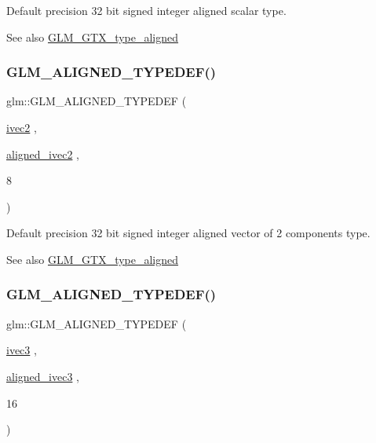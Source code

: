 Default precision 32 bit signed integer aligned scalar type. \begin{DoxySeeAlso}{See also}
\mbox{\hyperlink{group__gtx__type__aligned}{G\+L\+M\+\_\+\+G\+T\+X\+\_\+type\+\_\+aligned}} 
\end{DoxySeeAlso}
\mbox{\label{group__gtx__type__aligned_gac7b6f823802edbd6edbaf70ea25bf068}} 
\subsubsection{\texorpdfstring{GLM\_ALIGNED\_TYPEDEF()}{GLM\_ALIGNED\_TYPEDEF()}\hspace{0.1cm}{\footnotesize\ttfamily [50/209]}}
{\footnotesize\ttfamily glm\+::\+G\+L\+M\+\_\+\+A\+L\+I\+G\+N\+E\+D\+\_\+\+T\+Y\+P\+E\+D\+EF (\begin{DoxyParamCaption}\item[{\mbox{\hyperlink{group__core__types_ga9e6ce9cfc7919976b318197e18d8a065}{ivec2}}}]{,  }\item[{\mbox{\hyperlink{group__gtc__type__aligned_ga2a709e1d21f3aae3f8d6de910f5fdff4}{aligned\+\_\+ivec2}}}]{,  }\item[{8}]{ }\end{DoxyParamCaption})}

Default precision 32 bit signed integer aligned vector of 2 components type. \begin{DoxySeeAlso}{See also}
\mbox{\hyperlink{group__gtx__type__aligned}{G\+L\+M\+\_\+\+G\+T\+X\+\_\+type\+\_\+aligned}} 
\end{DoxySeeAlso}
\mbox{\label{group__gtx__type__aligned_ga3e235bcd2b8029613f25b8d40a2d3ef7}} 
\subsubsection{\texorpdfstring{GLM\_ALIGNED\_TYPEDEF()}{GLM\_ALIGNED\_TYPEDEF()}\hspace{0.1cm}{\footnotesize\ttfamily [51/209]}}
{\footnotesize\ttfamily glm\+::\+G\+L\+M\+\_\+\+A\+L\+I\+G\+N\+E\+D\+\_\+\+T\+Y\+P\+E\+D\+EF (\begin{DoxyParamCaption}\item[{\mbox{\hyperlink{group__core__types_ga6e12a4ca00d696f07da1df4eb73e0fe8}{ivec3}}}]{,  }\item[{\mbox{\hyperlink{group__gtc__type__aligned_gabbf85e492d39baef3a418c15c996ab65}{aligned\+\_\+ivec3}}}]{,  }\item[{16}]{ }\end{DoxyParamCaption})}

